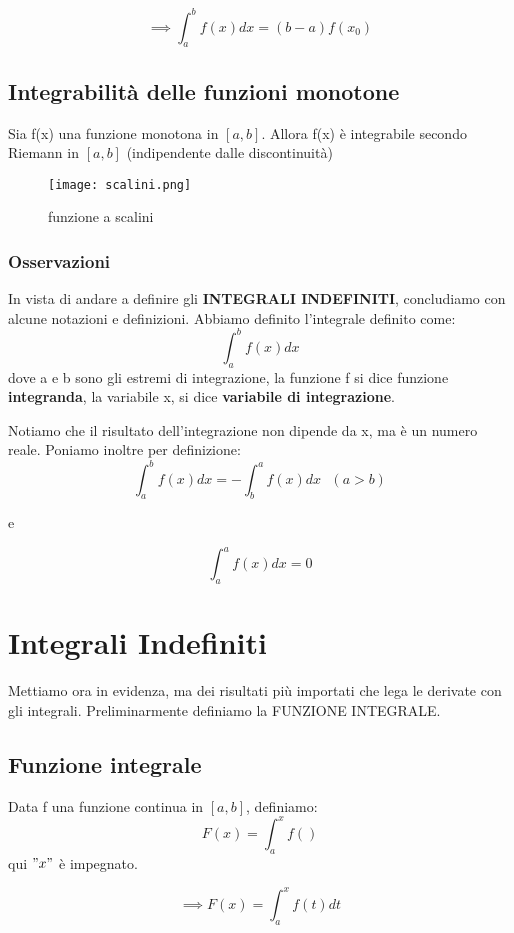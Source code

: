 \documentclass[../../main.tex]{subfiles}
\begin{document}
\[\implies \int_a^bf(x)dx = (b-a)f(x_0)\]

\subsection{Integrabilità delle funzioni monotone}
Sia f(x) una funzione monotona in $[a, b]$. Allora f(x) è integrabile secondo
Riemann in $[a, b]$ (indipendente dalle discontinuità) \\
\begin{figure}[ht]
    \centering
    \texttt{[image: scalini.png]}
    \caption{funzione a scalini}
    \label{fig:enter-label}
\end{figure}

\subsubsection{Osservazioni}
In vista di andare a definire gli \textbf{INTEGRALI INDEFINITI}, concludiamo
con alcune notazioni e definizioni. Abbiamo definito l'integrale definito come:
\[\int_a^bf(x)dx\] dove a e b sono gli estremi di integrazione, la funzione f si dice funzione
\textbf{integranda}, la variabile x, si dice \textbf{variabile di
    integrazione}.

Notiamo che il risultato dell'integrazione non dipende da x, ma è un numero
reale. Poniamo inoltre per definizione:\[\int_a^bf(x)dx = - \int_b^af(x)dx \ \
    \ (a > b)\]
\begin{center}
    e
\end{center}

\[\int_a^af(x)dx = 0\]

\section{Integrali Indefiniti}
Mettiamo ora in evidenza, ma dei risultati più importati che lega le derivate
con gli integrali. Preliminarmente definiamo la FUNZIONE INTEGRALE.

\subsection{Funzione integrale}
Data f una funzione continua in $[a, b]$, definiamo:\[F(x) = \int_a^xf( )\]
qui $"x"$ è impegnato.

\[\implies F(x) = \int_a^xf(t)dt\]
\end{document}
